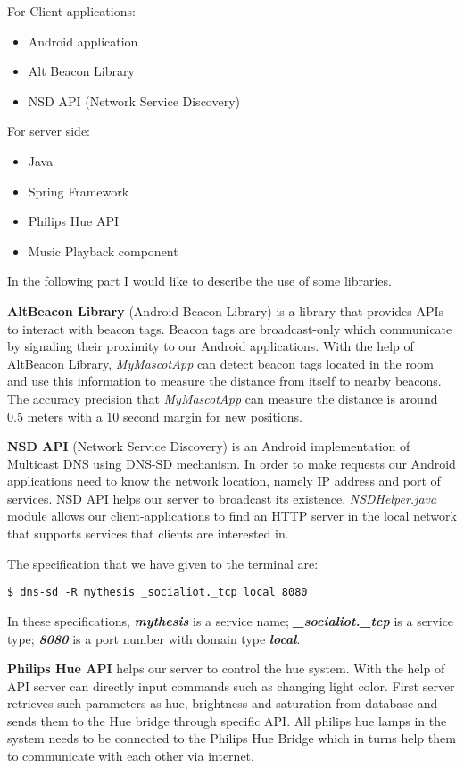 For Client applications:
\begin{itemize}
    \item Android application
    \item Alt Beacon Library
    \item NSD API (Network Service Discovery)
\end{itemize}

For server side:
\begin{itemize}
    \item Java
    \item Spring Framework
    \item Philips Hue API
    \item Music Playback component
\end{itemize}

In the following part I would like to describe the use of some libraries.

\textbf{AltBeacon Library} (Android Beacon Library) is a library that provides APIs to interact with beacon tags.
Beacon tags are broadcast-only which communicate by signaling their proximity to our Android applications.
With the help of AltBeacon Library, \emph{MyMascotApp} can detect beacon tags located in the room
and use this information to measure the distance from itself to nearby beacons.
The accuracy precision that \emph{MyMascotApp} can measure the distance is around 0.5 meters
with a 10 second margin for new positions.

\textbf{NSD API} (Network Service Discovery) is an Android implementation of Multicast DNS using DNS-SD mechanism.
In order to make requests our Android applications need to know the network location,
namely IP address and port of services.
NSD API helps our server to broadcast its existence.
\emph{NSDHelper.java} module allows our client-applications to find an HTTP server in the local network that supports
services that clients are interested in.

The specification that we have given to the terminal are:
\begin{lstlisting}[frame=single]
    $ dns-sd -R mythesis _socialiot._tcp local 8080
\end{lstlisting}
In these specifications, \textbf{\emph{mythesis}} is a service name;
\textbf{\emph{\_socialiot.\_tcp}} is a service type;
\textbf{\emph{8080}} is a port number with domain type \textbf{\emph{local}}.

\textbf{Philips Hue API} helps our server to control the hue system.
With the help of API server can directly input commands such as changing light color.
First server retrieves such parameters as hue, brightness and saturation from database and sends them
to the Hue bridge through specific API\@.
All philips hue lamps in the system needs to be connected to the Philips Hue Bridge which in turns help them
to communicate with each other via internet.

